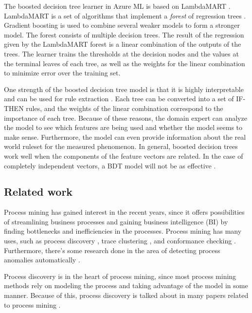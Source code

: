 The boosted decision tree learner in Azure ML is based on LambdaMART \cite{azurebdt}.
LambdaMART is a set of algorithms that implement a \textit{forest} of regression trees \cite{lambdamart2010}.
Gradient boosting \cite{friedman2001greedy} is used to combine several weaker models to form a stronger model.
The forest consists of multiple decision trees.
The result of the regression given by the LambdaMART forest is a linear combination of the outputs of the trees.
The learner trains the thresholds at the decision nodes and the values at the terminal leaves of each tree, as well as the weights for the linear combination to minimize error over the training set.

One strength of the boosted decision tree model is that it is highly interpretable and can be used for rule extraction \cite{alpaydin}. Each tree can be converted into a set of IF-THEN rules, and the weights of the linear combination correspond to the importance of each tree. 
Because of these reasons, the domain expert can analyze the model to see which features are being used and whether the model seems to make sense.
Furthermore, the model can even provide information about the real world ruleset for the measured phenomenon.
In general, boosted decision trees work well when the components of the feature vectors are related. In the case of completely independent vectors, a BDT model will not be as effective \cite{azurebdt}.


\subsection{Related work}
\label{sec:relatedwork}

Process mining has gained interest in the recent years, since it offers possibilities of streamlining business processes and gaining business intelligence (BI) by finding bottlenecks and inefficiencies in the processes.
Process mining has many uses, such as process discovery \cite{van2016discovery, van2013discovering}, trace clustering \cite{de2016general}, and conformance checking \cite{chomyat2016process}. Furthermore, there's some research done in the area of detecting process anomalies automatically \cite{bezerra2009anomaly}.

Process discovery is in the heart of process mining, since most process mining methods rely on modeling the process and taking advantage of the model in some manner.
Because of this, process discovery is talked about in many papers related to process mining \cite{chomyat2016process, de2016general, van2013discovering, van2015extracting, van2016process,bezerra2009anomaly}.

